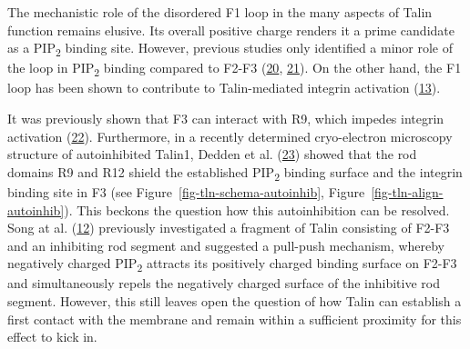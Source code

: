 \documentclass[
  twocolumn]{biophys-new-mod}
\begin{document}
The mechanistic role of the disordered F1 loop in the many aspects of
Talin function remains elusive. Its overall positive charge renders it a
prime candidate as a PIP\textsubscript{2} binding site. However,
previous studies only identified a minor role of the loop in
PIP\textsubscript{2} binding compared to F2-F3
(\protect\hyperlink{ref-chinthalapudiInteractionTalinCell2018a}{20},
\protect\hyperlink{ref-saltelNewPIP22009}{21}). On the other hand, the
F1 loop has been shown to contribute to Talin-mediated integrin
activation
(\protect\hyperlink{ref-goultStructureDoubleUbiquitinlike2010}{13}).

It was previously shown that F3 can interact with R9, which impedes
integrin activation
(\protect\hyperlink{ref-bannoSubcellularLocalizationTalin2012}{22}).
Furthermore, in a recently determined cryo-electron microscopy structure
of autoinhibited Talin1, Dedden et al.
(\protect\hyperlink{ref-deddenArchitectureTalin1Reveals2019a}{23})
showed that the rod domains R9 and R12 shield the established
PIP\textsubscript{2} binding surface and the integrin binding site in F3
(see
Figure~\ref{fig-tln-schema-autoinhib}, Figure~\ref{fig-tln-align-autoinhib}).
This beckons the question how this autoinhibition can be resolved. Song
at al.
(\protect\hyperlink{ref-songNovelMembranedependentSwitch2012a}{12})
previously investigated a fragment of Talin consisting of F2-F3 and an
inhibiting rod segment and suggested a pull-push mechanism, whereby
negatively charged PIP\textsubscript{2} attracts its positively charged
binding surface on F2-F3 and simultaneously repels the negatively
charged surface of the inhibitive rod segment. However, this still
leaves open the question of how Talin can establish a first contact with
the membrane and remain within a sufficient proximity for this effect to
kick in.
\end{document}
